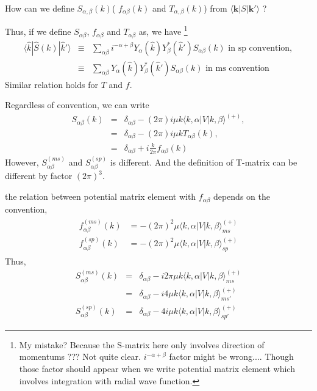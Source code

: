 \documentclass[10pt]{book}
\def\bm{\boldsymbol}
\newcommand{\bea}{\begin{eqnarray}}
\newcommand{\eea}{\end{eqnarray}}
\newcommand{\no}{\nonumber \\}
\def\vk{{\bm k}}
\def\la{\langle}
\def\ra{\rangle}
\begin{document}
\begin{itemize}
How can we define $S_{\alpha,\beta}(k)$( $f_{\alpha\beta}(k)$
and $T_{\alpha,\beta}(k)$) from $\la \vk| S|\vk' \ra$ ?


Thus, if we define $S_{\alpha\beta}$, $f_{\alpha\beta}$ and
$T_{\alpha\beta}$ as, we have
\footnote{
My mistake?
Because the S-matrix here only involves direction of
momentums  
??? Not quite clear. $i^{-\alpha+\beta}$ factor
might be wrong....
Though those factor should appear when we write 
potential matrix element which involves integration with
radial wave function.
}
\bea
\la \hat{k}|\hat{S}(k)|\hat{k}'\ra&\equiv&
      \sum_{\alpha\beta} i^{-\alpha+\beta}
      Y_{\alpha}(\hat{k})Y_{\beta}^*(\hat{k}') S_{\alpha\beta}(k)
      \mbox{ in sp convention}
      ,\no
      &\equiv&
      \sum_{\alpha\beta}
      Y_{\alpha}(\hat{k})Y_{\beta}^*(\hat{k}') S_{\alpha\beta}(k)
      \mbox{ in ms convention}
\eea
Similar relation holds for $T$ and $f$.

Regardless of convention,  we can write 
\begin{equation}
\boxed{
\begin{array}{ccl}
S_{\alpha\beta}(k)
&=&\delta_{\alpha\beta}-(2\pi)i \mu k 
        \la k,\alpha| V| k,\beta\ra^{(+)},\\
&=&\delta_{\alpha\beta} -(2\pi)i \mu k T_{\alpha\beta}(k),\\
&=&\delta_{\alpha\beta}+ i\frac{k}{2\pi} f_{\alpha\beta}(k)
\end{array}
}
\end{equation}
However, $S_{\alpha\beta}^{(ms)}$
and $S_{\alpha\beta}^{(sp)}$ is different.
And the definition of T-matrix can be different by factor $(2\pi)^3$.

the relation between potential matrix
element with $f_{\alpha\beta}$ depends on the convention,
\bea
\boxed{
\begin{array}{cl}
f_{\alpha\beta}^{(ms)}(k)
&=-(2\pi)^2\mu \la k,\alpha|V|k,\beta\ra^{(+)}_{ms} \\
f_{\alpha\beta}^{(sp)}(k)
&=-(2\pi)^2\mu \la k,\alpha|V|k,\beta\ra^{(+)}_{sp}
\end{array}
}
\eea
Thus,
\bea
S_{\alpha\beta}^{(ms)}(k)
&=&\delta_{\alpha\beta}
  -i2\pi \mu k \la k,\alpha|V|k,\beta\ra^{(+)}_{ms}\no
&=&\delta_{\alpha\beta}
  -i4 \mu k \la k,\alpha|V|k,\beta\ra^{(+)}_{ms'}\no
S_{\alpha\beta}^{(sp)}(k)&=&\delta_{\alpha\beta}
  -4 i \mu k \la k,\alpha|V|k,\beta\ra^{(+)}_{sp'} 
\eea




\end{itemize}
\end{document}
